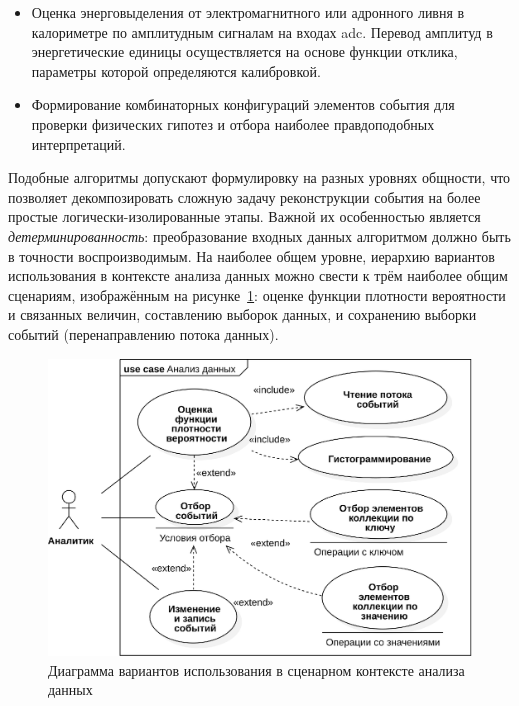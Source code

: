 \begin{itemize}
    \item Оценка энерговыделения от электромагнитного или адронного ливня в калориметре по амплитудным сигналам на входах \acrshort{adc}. Перевод амплитуд в энергетические единицы осуществляется на основе функции отклика, параметры которой определяются калибровкой.
    
    \item Формирование комбинаторных конфигураций элементов события для проверки физических гипотез и отбора наиболее правдоподобных интерпретаций.
\end{itemize}

Подобные алгоритмы допускают формулировку на разных уровнях общности, что позволяет декомпозировать сложную задачу реконструкции события на более простые логически-изолированные этапы. Важной их особенностью является \emph{детерминированность}: преобразование входных данных алгоритмом должно быть в точности воспроизводимым.
На наиболее общем уровне, иерархию вариантов использования в контексте анализа
данных можно свести к трём наиболее общим сценариям, изображённым на
рисунке~\ref{fig:analysis-main-usecases}: оценке функции
плотности вероятности и связанных величин, составлению выборок данных,
и сохранению выборки событий (перенаправлению потока данных).

\begin{figure}[ht!]
    \centering
    \includegraphics[width=0.85\linewidth]{images/usecases/analysis-usecase.eps}
    \caption{Диаграмма вариантов использования в сценарном контексте анализа данных}
    \label{fig:analysis-main-usecases}
\end{figure}

